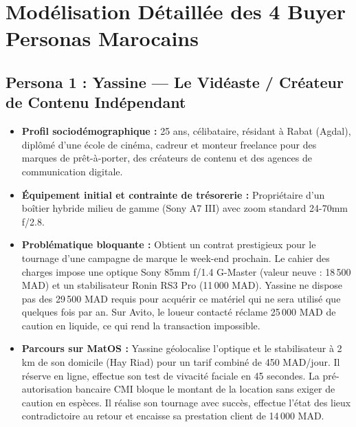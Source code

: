 \documentclass[11pt,a4paper]{report}
\begin{document}
\chapter{Modélisation Détaillée des 4 Buyer Personas Marocains}

\section{Persona 1 : Yassine --- Le Vidéaste / Créateur de Contenu Indépendant}
\begin{itemize}[leftmargin=*]
    \item \textbf{Profil sociodémographique :} 25 ans, célibataire, résidant à Rabat (Agdal), diplômé d'une école de cinéma, cadreur et monteur freelance pour des marques de prêt-à-porter, des créateurs de contenu et des agences de communication digitale.
    \item \textbf{Équipement initial et contrainte de trésorerie :} Propriétaire d'un boîtier hybride milieu de gamme (Sony A7 III) avec zoom standard 24-70mm f/2.8.
    \item \textbf{Problématique bloquante :} Obtient un contrat prestigieux pour le tournage d'une campagne de marque le week-end prochain. Le cahier des charges impose une optique Sony 85mm f/1.4 G-Master (valeur neuve : 18\,500 MAD) et un stabilisateur Ronin RS3 Pro (11\,000 MAD). Yassine ne dispose pas des 29\,500 MAD requis pour acquérir ce matériel qui ne sera utilisé que quelques fois par an. Sur Avito, le loueur contacté réclame 25\,000 MAD de caution en liquide, ce qui rend la transaction impossible.
    \item \textbf{Parcours sur MatOS :} Yassine géolocalise l'optique et le stabilisateur à 2 km de son domicile (Hay Riad) pour un tarif combiné de 450 MAD/jour. Il réserve en ligne, effectue son test de vivacité faciale en 45 secondes. La pré-autorisation bancaire CMI bloque le montant de la location sans exiger de caution en espèces. Il réalise son tournage avec succès, effectue l'état des lieux contradictoire au retour et encaisse sa prestation client de 14\,000 MAD.
\end{itemize}
\end{document}
